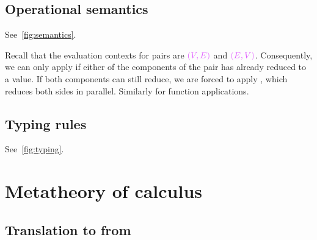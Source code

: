 \documentclass[main.tex]{subfiles}
\begin{document}
\subsection{Operational semantics}
\label{sec:lvar-semantics}

See~\cref{fig:semantics}.

Recall that the evaluation contexts for pairs are $\tm{(V, E)}$ and $\tm{(E, V)}$. Consequently, we can only apply  if either of the components of the pair has already reduced to a value. If both components can still reduce, we are forced to apply , which reduces both sides in parallel. Similarly for function applications.

\subsection{Typing rules}%
\label{sec:lvar-typing}

See~\cref{fig:typing}.

\section{Metatheory of \typedlambdalvar calculus}

\subsection{Translation to \lambdalvar  from \typedlambdalvar}


\end{document}
